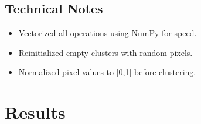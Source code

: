 \documentclass{article}
\begin{document}
\subsection{Technical Notes}
\begin{adjustwidth}{1cm}{}
\begin{itemize}
    \item Vectorized all operations using NumPy for speed.
    \item Reinitialized empty clusters with random pixels.
    \item Normalized pixel values to [0,1] before clustering.
\end{itemize}
\end{adjustwidth}

\section{Results}
\end{document}

